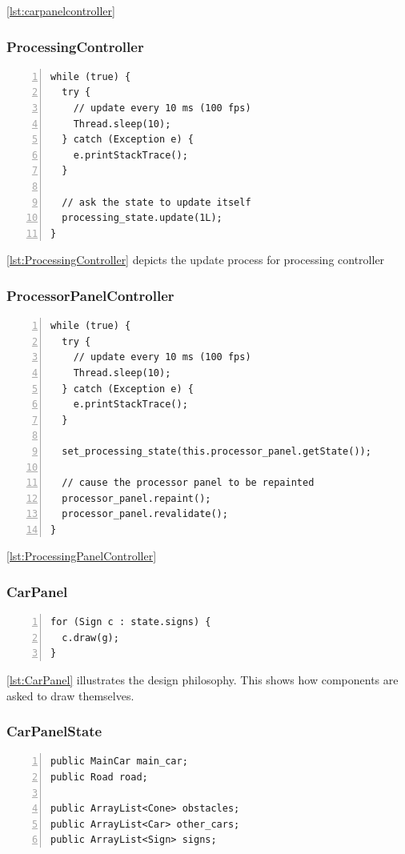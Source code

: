 \documentclass{article} %
\begin{document}
\ref{lst:carpanelcontroller}

\subsubsection{ProcessingController}
\begin{lstlisting}[caption={Processing Controller Update Procedure},label={lst:ProcessingController},numbers=left]
while (true) {
  try {
    // update every 10 ms (100 fps)
    Thread.sleep(10);
  } catch (Exception e) {
    e.printStackTrace();
  }

  // ask the state to update itself
  processing_state.update(1L);
}
\end{lstlisting}

\ref{lst:ProcessingController} depicts the update process for processing controller

\subsubsection{ProcessorPanelController}
\begin{lstlisting}[caption={Processing Panel Update Procedure},label={lst:ProcessingPanelController},numbers=left]
while (true) {
  try {
    // update every 10 ms (100 fps)
    Thread.sleep(10);
  } catch (Exception e) {
    e.printStackTrace();
  }

  set_processing_state(this.processor_panel.getState());
  
  // cause the processor panel to be repainted
  processor_panel.repaint();
  processor_panel.revalidate();
}
\end{lstlisting}

\ref{lst:ProcessingPanelController}

\subsubsection{CarPanel}
\begin{lstlisting}[caption={Ask Signs to Draw Themselves},label={lst:CarPanel},numbers=left]
for (Sign c : state.signs) {
  c.draw(g);
}
\end{lstlisting}

\ref{lst:CarPanel} illustrates the design philosophy. 
This shows how components are asked to draw themselves.

\subsubsection{CarPanelState}
\begin{lstlisting}[caption={Car Panel State maintains all objects drawn on the screen},label={lst:CarPanelState},numbers=left]
public MainCar main_car;
public Road road;

public ArrayList<Cone> obstacles;
public ArrayList<Car> other_cars;
public ArrayList<Sign> signs;
\end{lstlisting}
\end{document}
